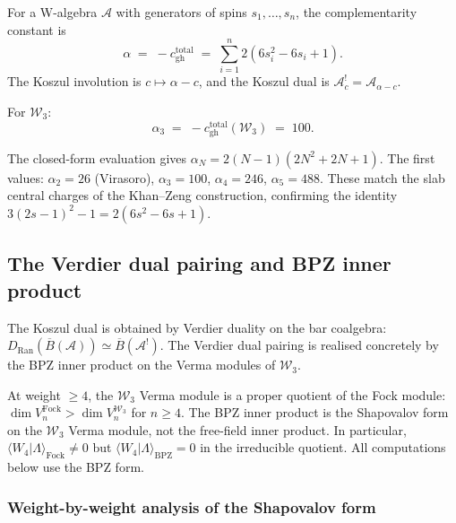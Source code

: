 \documentclass[11pt]{article}
\newcommand{\cA}{\mathcal{A}}
\newcommand{\cW}{\mathcal{W}}
\newcommand{\barB}{\overline{B}}
\begin{document}
\begin{definition}
For a W-algebra $\cA$ with generators of spins $s_1, \ldots, s_n$,
the complementarity constant is
\begin{equation}
\alpha \;=\; -c_{\mathrm{gh}}^{\mathrm{total}}
\;=\; \sum_{i=1}^n 2(6s_i^2 - 6s_i + 1).
\end{equation}
The Koszul involution is $c \mapsto \alpha - c$, and the Koszul
dual is $\cA_c^! = \cA_{\alpha - c}$.
\end{definition}

For $\cW_3$:
\begin{equation}\label{eq:alpha-W3}
\alpha_3 \;=\; -c_{\mathrm{gh}}^{\mathrm{total}}(\cW_3)
\;=\; 100.
\end{equation}

\begin{remark}[The general $\cW_N$ formula]
The closed-form evaluation gives
$\alpha_N = 2(N-1)(2N^2 + 2N + 1)$.  The first values:
$\alpha_2 = 26$ (Virasoro), $\alpha_3 = 100$, $\alpha_4 = 246$,
$\alpha_5 = 488$.  These match the slab central charges of the
Khan--Zeng construction, confirming the identity
$3(2s-1)^2 - 1 = 2(6s^2 - 6s + 1)$.
\end{remark}

\subsection{The Verdier dual pairing and BPZ inner product}

The Koszul dual is obtained by Verdier duality on the bar coalgebra:
$D_{\mathrm{Ran}}(\barB(\cA)) \simeq \barB(\cA^!)$.  The Verdier
dual pairing is realised concretely by the BPZ inner product on the
Verma modules of $\cW_3$.

\begin{warning}
\label{warn:BPZ-not-Fock}
At weight $\ge 4$, the $\cW_3$ Verma module is a proper quotient
of the Fock module: $\dim V_n^{\mathrm{Fock}} > \dim V_n^{\cW_3}$
for $n \ge 4$.  The BPZ inner product is the Shapovalov form on
the $\cW_3$ Verma module, not the free-field inner product.  In
particular, $\langle W_4 | \Lambda \rangle_{\mathrm{Fock}} \ne 0$
but $\langle W_4 | \Lambda \rangle_{\mathrm{BPZ}} = 0$ in the
irreducible quotient.  All computations below use the BPZ form.
\end{warning}

\subsubsection{Weight-by-weight analysis of the Shapovalov form}
\end{document}
